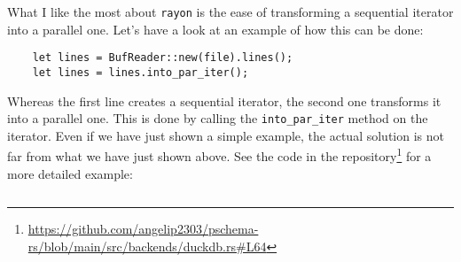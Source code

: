 What I like the most about \texttt{rayon} is the ease of transforming a sequential iterator into a parallel one. Let's have a look at an example of how this can be done:

\begin{verbatim}
    let lines = BufReader::new(file).lines();
    let lines = lines.into_par_iter();
\end{verbatim}

Whereas the first line creates a sequential iterator, the second one transforms it into a parallel one. This is done by calling the \texttt{into\_par\_iter} method on the iterator. Even if we have just shown a simple example, the actual solution is not far from what we have just shown above. See the code in the repository\footnote{\url{https://github.com/angelip2303/pschema-rs/blob/main/src/backends/duckdb.rs\#L64}} for a more detailed example:

\begin{code}
    \inputminted{rust}{code/listings/11-2_duckdb.rs}
\end{code}